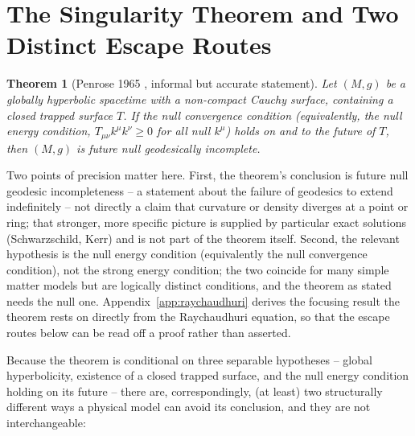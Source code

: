 \documentclass[11pt]{article}
\newtheorem{theorem}{Theorem}
\begin{document}
\section{The Singularity Theorem and Two Distinct Escape Routes}

\begin{theorem}[Penrose 1965 \cite{penrose1965}, informal but accurate statement]
Let $(M,g)$ be a globally hyperbolic spacetime with a non-compact Cauchy surface, containing a closed trapped surface $T$. If the null convergence condition (equivalently, the null energy condition, $T_{\mu\nu}k^\mu k^\nu \geq 0$ for all null $k^\mu$) holds on and to the future of $T$, then $(M,g)$ is future null geodesically incomplete.
\end{theorem}
Two points of precision matter here. First, the theorem's conclusion is future null geodesic incompleteness -- a statement about the failure of geodesics to extend indefinitely -- not directly a claim that curvature or density diverges at a point or ring; that stronger, more specific picture is supplied by particular exact solutions (Schwarzschild, Kerr) and is not part of the theorem itself. Second, the relevant hypothesis is the null energy condition (equivalently the null convergence condition), not the strong energy condition; the two coincide for many simple matter models but are logically distinct conditions, and the theorem as stated needs the null one. Appendix~\ref{app:raychaudhuri} derives the focusing result the theorem rests on directly from the Raychaudhuri equation, so that the escape routes below can be read off a proof rather than asserted.

Because the theorem is conditional on three separable hypotheses -- global hyperbolicity, existence of a closed trapped surface, and the null energy condition holding on its future -- there are, correspondingly, (at least) two structurally different ways a physical model can avoid its conclusion, and they are not interchangeable:
\end{document}
